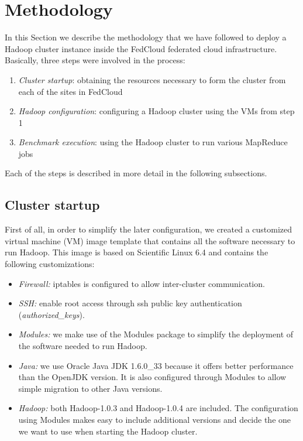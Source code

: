 \documentclass[oribibl]{llncs_Ibergrid2013}
\begin{document}
\section{Methodology}
\label{sect-methodology}
In this Section we describe the methodology that we have followed to deploy a Hadoop cluster instance inside the FedCloud federated cloud infrastructure. Basically, three steps were involved in the process: 
\begin{enumerate}
\item \emph{Cluster startup}: obtaining the resources necessary to form the cluster from each of the sites in FedCloud
\item \emph{Hadoop configuration}: configuring a Hadoop cluster using the VMs from step 1
\item \emph{Benchmark execution}: using the Hadoop cluster to run various MapReduce jobs
\end{enumerate}
Each of the steps is described in more detail in the following subsections.

\subsection{Cluster startup}
\label{ssect-cluster}

First of all, in order to simplify the later configuration, we created a customized virtual machine (VM) image template that contains all the software necessary to run Hadoop. This image is based on Scientific Linux 6.4 and contains the following customizations:
\begin{itemize}
\item \emph{Firewall:} iptables is configured to allow inter-cluster communication.
\item \emph{SSH:} enable root access through ssh public key authentication (\emph{authorized\_keys}).
\item \emph{Modules:} we make use of the Modules package to simplify the deployment of the software needed to run Hadoop.
\item \emph{Java:} we use Oracle Java JDK 1.6.0\_33 because it offers better performance than the OpenJDK version. It is also configured through Modules to allow simple migration to other Java versions.
\item \emph{Hadoop:} both Hadoop-1.0.3 and Hadoop-1.0.4 are included. The configuration using Modules makes easy to include additional versions and decide the one we want to use when starting the Hadoop cluster.
\end{itemize}
\end{document}
